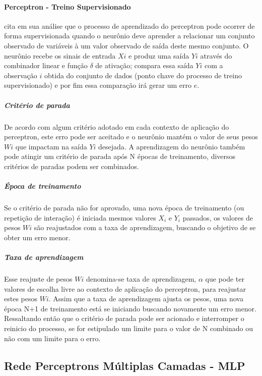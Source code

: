 \documentclass[	12pt, Times, openright, twoside, a4paper, english, brazil]{abntex2}
\begin{document}
		      \paragraph*{Perceptron - Treino Supervisionado}
            \cite{Almeida2013} cita em sua análise que o processo de aprendizado do perceptron pode ocorrer de forma supervisionada quando o neurônio deve aprender a relacionar um conjunto observado de variáveis à um valor observado de saída deste mesmo conjunto. O neurônio recebe os sinais de entrada $Xi$ e produz uma saída $Yi$ através do combinador linear e função $\delta$ de ativação; compara essa saída $Yi$ com a observação $i$ obtida do conjunto de dados (ponto chave do processo de treino supervisionado) e por fim essa comparação irá gerar um erro $e$.
            
            \subparagraph*{Critério de parada}
            	De acordo com algum critério adotado em cada contexto de aplicação do perceptron, este erro pode ser aceitado e o neurônio mantém o valor de seus pesos $Wi$ que impactam na saída $Yi$ desejada. A aprendizagem do neurônio também pode atingir um critério de parada após N épocas de treinamento, diversos critérios de paradas  podem ser combinados.  
            	
            \subparagraph*{Época de treinamento}
            	Se o critério de parada não for aprovado, uma nova época de treinamento (ou repetição de interação) é iniciada mesmos valores $X_i$ e $Y_i$ passados, os valores de pesos $Wi$ são reajustados com a taxa de aprendizagem, buscando o objetivo de se obter um erro menor.
            	
            \subparagraph {Taxa de aprendizagem}
            	Esse reajuste de pesos $Wi$ denomina-se taxa de aprendizagem, $\alpha$ que pode ter valores de escolha livre ao contexto de aplicação do perceptron, para reajustar estes pesos $Wi$. Assim que a taxa de aprendizagem ajusta os pesos, uma nova época N+1 de treinamento está se iniciando buscando novamente um erro menor. Ressaltando então que o critério de parada pode ser acionado e interromper o reinicio do processo, se for estipulado um limite para o valor de N combinado ou não com um limite para o erro. 
            	
  	    \subsection{Rede Perceptrons Múltiplas Camadas - MLP}
  	       
\end{document}
